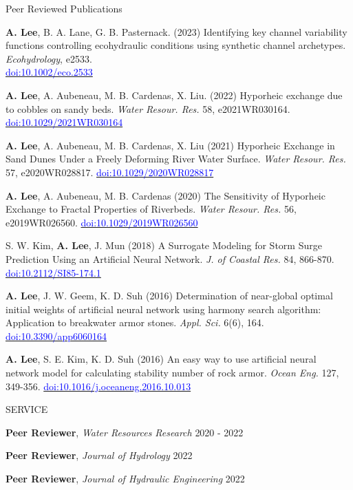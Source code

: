\documentclass{resume_anzy} %
\begin{document}
\begin{rSection}{Peer Reviewed Publications}
\vspace{-2.5mm}
\item \textbf{A. Lee}, B. A. Lane, G. B. Pasternack. (2023) Identifying key channel variability functions controlling ecohydraulic conditions using synthetic channel archetypes.  \textit{Ecohydrology}, e2533. \\ \href{https://doi.org/10.1002/eco.2533}{\textcolor{blue}{doi:10.1002/eco.2533}}
\item \textbf{A. Lee}, A. Aubeneau, M. B. Cardenas, X. Liu. (2022) Hyporheic exchange due to cobbles on sandy beds. \textit{Water Resour. Res.} 58, e2021WR030164. \href{https://doi.org/10.1029/2021WR030164}{\textcolor{blue}{doi:10.1029/2021WR030164}}
\item \textbf{A. Lee}, A. Aubeneau, M. B. Cardenas, X. Liu (2021) Hyporheic Exchange in Sand Dunes Under a Freely Deforming River Water Surface. \textit{Water Resour. Res.} 57, e2020WR028817. \href{https://doi.org/10.1029/2020WR028817}{\textcolor{blue}{doi:10.1029/2020WR028817}}
\item \textbf{A. Lee}, A. Aubeneau, M. B. Cardenas (2020) The Sensitivity of Hyporheic Exchange to Fractal Properties of Riverbeds. \textit{Water Resour. Res.} 56, e2019WR026560. \href{https://doi.org/10.1029/2019WR026560}{\textcolor{blue}{doi:10.1029/2019WR026560}}
\item S. W. Kim, \textbf{A. Lee}, J. Mun (2018) A Surrogate Modeling for Storm Surge Prediction Using an Artificial Neural Network. \textit{J. of Coastal Res.} 84, 866-870. \href{https://doi.org/10.2112/SI85-174.1}{\textcolor{blue}{doi:10.2112/SI85-174.1}}
\item \textbf{A. Lee}, J. W. Geem, K. D. Suh (2016) Determination of near-global optimal initial weights of artificial neural network using harmony search algorithm: Application to breakwater armor stones. \textit{Appl. Sci.} 6(6), 164. \href{https://doi.org/10.3390/app6060164}{\textcolor{blue}{doi:10.3390/app6060164}}
\item \textbf{A. Lee}, S. E. Kim, K. D. Suh (2016) An easy way to use artificial neural network model for calculating stability number of rock armor. \textit{Ocean Eng.} 127, 349-356.  \href{https://doi.org/10.1016/j.oceaneng.2016.10.013}{\textcolor{blue}{doi:10.1016/j.oceaneng.2016.10.013}}
\end{rSection}

\begin{rSection}{SERVICE}
\vspace{-2.5mm}
\item \textbf{Peer Reviewer}, \textit{Water Resources Research} \hfill{2020 - 2022}
\item \textbf{Peer Reviewer}, \textit{Journal of Hydrology} \hfill{2022}
\item \textbf{Peer Reviewer}, \textit{Journal of Hydraulic Engineering} \hfill{2022}

\end{rSection}
\end{document}
